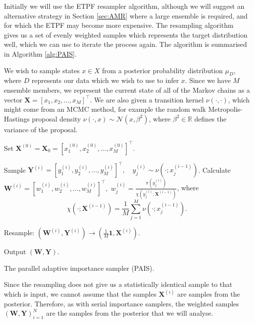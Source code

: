 \documentclass[final]{siamltex}
\newcommand{\X}{{\mathbf X}}
\newcommand{\Y}{{\mathbf Y}}
\newcommand{\W}{{\mathbf W}}
\begin{document}
Initially we
will use the ETPF resampler algorithm\cite{reich2013nonparametric}, although we
will suggest an alternative strategy in Section \ref{sec:AMR} where a
large ensemble is required, and for which the ETPF may become more expensive. The
resampling algorithm gives us a set of evenly weighted samples which
represents the target distribution well, which we can use to iterate
the process again. The algorithm is summarised in Algorithm
\ref{alg:PAIS}.

We wish to sample states $x \in X$ from a posterior
probability distribution $\mu_D$, where $D$ represents our data which
we wish to use to infer $x$. Since we have $M$ ensemble members, we
represent the current state of all of the Markov chains as a vector
$\X = [x_1,x_2,\ldots,x_M]^\top$. We are also given a transition kernel
$\nu(\cdot,\cdot)$, which might come from an MCMC method, for example
the random walk Metropolis-Hastings proposal density $\nu(\cdot,x) \sim
\mathcal{N}(x,\beta^2)$, where $\beta^2\in \mathbb{R}$ defines the
variance of the proposal.

\begin{table}[!ht]
\centering
\begin{algorithm}[H]
\DontPrintSemicolon
\BlankLine
	Set $\X^{(0)} = \X_0 = [x_1^{(0)},x_2^{(0)},\ldots,x_M^{(0)}]^\top$.\;
	{
		Sample $\Y^{(i)} = [y_1^{(i)},y_2^{(i)},\ldots,y_M^{(i)}]^\top, \quad y_j^{(i)} \sim
\nu(\cdot;x_j^{(i-1)})$.\label{algline:PAIS_propose}\;
		Calculate $\W^{(i)} = [w_1^{(i)},w_2^{(i)},\ldots,w_M^{(i)}]^\top,$ \quad $w^{(i)}_j =
\frac{\pi(y_j^{(i)})}{\chi(y_j^{(i)};\X^{(i-1)})}$, where
		\[
			\chi(\cdot;\X^{(i-1)}) = \frac{1}{M}\sum_{j=1}^M \nu(\cdot;x_j^{(i-1)}).
		\]

		Resample: $(\W^{(i)},\Y^{(i)}) \rightarrow (\frac{1}{M}\mathbf{1}, \X^{(i)})$.\label{algline:PAIS_resample}\;
	}
	Output $(\W, \Y)$.\;
\caption{The parallel adaptive importance sampler (PAIS).\label{alg:PAIS}}
\end{algorithm}
\end{table}

Since the resampling does not give us a statistically identical sample
to that which is input, we cannot assume that the samples $\X^{(i)}$
are samples from the posterior. Therefore, as with serial
importance samplers, the weighted samples
$(\W,\Y)_{i=1}^N$ are the samples from the posterior that
we will analyse.
\end{document}
